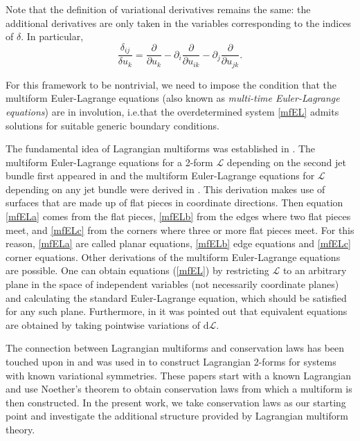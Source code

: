 \documentclass[12pt, a4paper]{article}
\theoremstyle{definition}
\renewcommand{\d}{\mathrm{d}}
\newcommand{\cL}{\mathcal{L}}
\newcommand{\var}[3]{\frac{\delta_{#1} #2}{\delta #3}}
\newcommand{\der}[2]{\frac{\partial #1}{\partial #2}}
\begin{document}
Note that the definition of variational derivatives remains the same: the additional derivatives are only taken in the variables corresponding to the indices of $\delta$. In particular,
\[ \var{ij}{}{u_k} = \der{}{u_k} - \partial_i \der{}{u_{ik}} - \partial_j \der{}{u_{jk}} . \]
 


For this framework to be nontrivial, we need to impose the condition that the multiform Euler-Lagrange equations (also known as \emph{multi-time Euler-Lagrange equations}) are in involution, i.e.\@ that the overdetermined system \eqref{mfEL} admits solutions for
suitable generic boundary conditions.

The fundamental idea of Lagrangian multiforms was established in \cite{lobb2009lagrangian}. The multiform Euler-Lagrange equations for a 2-form $\cL$ depending on the second jet bundle first appeared in \cite{suris2016variational} and the multiform Euler-Lagrange equations for $\cL$ depending on any jet bundle were derived in \cite{suris2016lagrangian}. This derivation makes use of surfaces that are made up of flat pieces in coordinate directions. Then equation \eqref{mfELa} comes from the flat pieces, \eqref{mfELb} from the edges where two flat pieces meet, and \eqref{mfELc} from the corners where three or more flat pieces meet. For this reason, \eqref{mfELa} are called planar equations, \eqref{mfELb} edge equations and \eqref{mfELc} corner equations. Other derivations of the multiform Euler-Lagrange equations are possible. One can obtain equations (\ref{mfEL}) by restricting $\cL$ to an arbitrary plane in the space of independent variables (not necessarily  coordinate planes) and calculating the standard Euler-Lagrange equation, which should be satisfied for any such plane. Furthermore, in \cite{sleigh2023lagrangian} it was pointed out that equivalent equations are obtained by taking pointwise variations of $\d \cL$.

The connection between Lagrangian multiforms and conservation laws has been touched upon in \cite{suris2016variational, petrera2017variational} and was used in \cite{petrera2021variational, sleigh2020variational} to construct Lagrangian 2-forms for systems with known variational symmetries. These papers start with a known Lagrangian and use Noether's theorem to obtain conservation laws from which a multiform is then constructed. In the present work, we take conservation laws as our starting point and investigate the additional structure provided by Lagrangian multiform theory.
\end{document}
